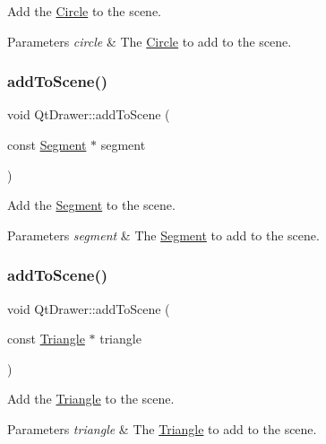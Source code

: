 Add the \hyperlink{class_circle}{Circle} to the scene. 
\begin{DoxyParams}{Parameters}
{\em circle} & The \hyperlink{class_circle}{Circle} to add to the scene. \\
\hline
\end{DoxyParams}
\hypertarget{class_qt_drawer_a7210a0775cf19ce5de0601028c8d7712}{}\label{class_qt_drawer_a7210a0775cf19ce5de0601028c8d7712} 
\subsubsection{\texorpdfstring{add\+To\+Scene()}{addToScene()}\hspace{0.1cm}{\footnotesize\ttfamily [2/5]}}
{\footnotesize\ttfamily void Qt\+Drawer\+::add\+To\+Scene (\begin{DoxyParamCaption}\item[{const \hyperlink{class_segment}{Segment} $\ast$}]{segment }\end{DoxyParamCaption})}

Add the \hyperlink{class_segment}{Segment} to the scene. 
\begin{DoxyParams}{Parameters}
{\em segment} & The \hyperlink{class_segment}{Segment} to add to the scene. \\
\hline
\end{DoxyParams}
\hypertarget{class_qt_drawer_a5515539c77eb172644859e115a8044bc}{}\label{class_qt_drawer_a5515539c77eb172644859e115a8044bc} 
\subsubsection{\texorpdfstring{add\+To\+Scene()}{addToScene()}\hspace{0.1cm}{\footnotesize\ttfamily [3/5]}}
{\footnotesize\ttfamily void Qt\+Drawer\+::add\+To\+Scene (\begin{DoxyParamCaption}\item[{const \hyperlink{class_triangle}{Triangle} $\ast$}]{triangle }\end{DoxyParamCaption})}

Add the \hyperlink{class_triangle}{Triangle} to the scene. 
\begin{DoxyParams}{Parameters}
{\em triangle} & The \hyperlink{class_triangle}{Triangle} to add to the scene. \\
\hline
\end{DoxyParams}
\hypertarget{class_qt_drawer_a48a8a31ffdc14e6122b78779c0cdfb39}{}\label{class_qt_drawer_a48a8a31ffdc14e6122b78779c0cdfb39} 
